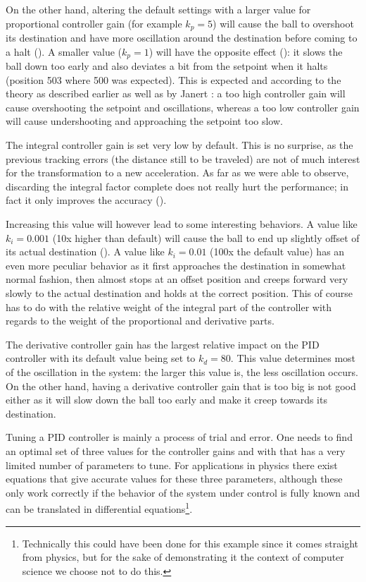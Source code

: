 On the other hand, altering the default settings with a larger value for proportional controller gain (for example $k_p = 5$) will cause the ball to overshoot its destination and have more oscillation around the destination before coming to a halt (). A smaller value ($k_p = 1$) will have the opposite effect (): it slows the ball down too early and also deviates a bit from the setpoint when it halts (position 503 where 500 was expected). This is expected and according to the theory as described earlier as well as by Janert \cite{janert2013-feedback}: a too high controller gain will cause overshooting the setpoint and oscillations, whereas a too low controller gain will cause undershooting and approaching the setpoint too slow.

The integral controller gain is set very low by default. This is no surprise, as the previous tracking errors (the distance still to be traveled) are not of much interest for the transformation to a new acceleration. As far as we were able to observe, discarding the integral factor complete does not really hurt the performance; in fact it only improves the accuracy ().

Increasing this value will however lead to some interesting behaviors. A value like $k_i = 0.001$ (10x higher than default) will cause the ball to end up slightly offset of its actual destination (). A value like $k_i = 0.01$ (100x the default value) has an even more peculiar behavior as it first approaches the destination in somewhat normal fashion, then almost stops at an offset position and creeps forward very slowly to the actual destination and holds at the correct position. This of course has to do with the relative weight of the integral part of the controller with regards to the weight of the proportional and derivative parts.

The derivative controller gain has the largest relative impact on the PID controller with its default value being set to $k_d = 80$. This value determines most of the oscillation in the system: the larger this value is, the less oscillation occurs. On the other hand, having a derivative controller gain that is too big is not good either as it will slow down the ball too early and make it creep towards its destination.

Tuning a PID controller is mainly a process of trial and error. One needs to find an optimal set of three values for the controller gains and with that has a very limited number of parameters to tune. For applications in physics there exist equations that give accurate values for these three parameters, although these only work correctly if the behavior of the system under control is fully known and can be translated in differential equations\footnote{Technically this could have been done for this example since it comes straight from physics, but for the sake of demonstrating it the context of computer science we choose not to do this.}.

